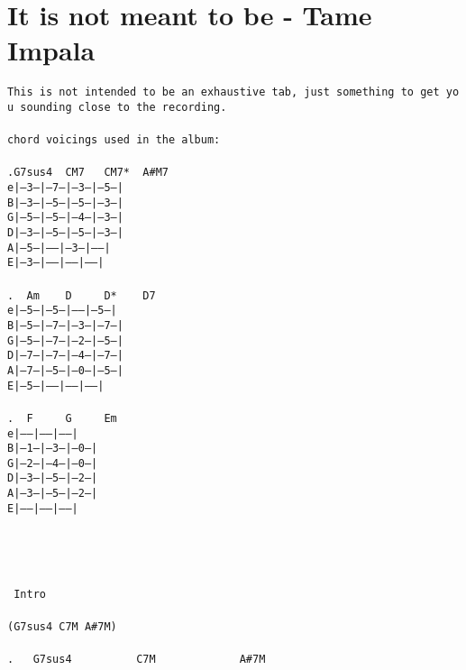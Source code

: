 \newpage
\section{It is not meant to be - Tame Impala}
\label{It is not meant to be - Tame Impala}
\texttt{This\ is\ not\ intended\ to\ be\ an\ exhaustive\ tab,\ just\ something\ to\ get\ you\ sounding\ close\ to\ the\ recording.\\
\\
chord\ voicings\ used\ in\ the\ album:\\
\\
.G7sus4\ \ CM7\ \ \ CM7*\ \ A\#M7\\
e|--3--|--7--|--3--|--5--|\\
B|--3--|--5--|--5--|--3--|\\
G|--5--|--5--|--4--|--3--|\\
D|--3--|--5--|--5--|--3--|\\
A|--5--|-----|--3--|-----|\\
E|--3--|-----|-----|-----|\\
\\
. \ Am\ \ \ \ D\ \ \ \ \ D*\ \ \ \ D7\\
e|--5--|--5--|-----|--5--|\\
B|--5--|--7--|--3--|--7--|\\
G|--5--|--7--|--2--|--5--|\\
D|--7--|--7--|--4--|--7--|\\
A|--7--|--5--|--0--|--5--|\\
E|--5--|-----|-----|-----|\\
\\
. \ F\ \ \ \ \ G\ \ \ \ \ Em\\
e|-----|-----|-----|\\
B|--1--|--3--|--0--|\\
G|--2--|--4--|--0--|\\
D|--3--|--5--|--2--|\\
A|--3--|--5--|--2--|\\
E|-----|-----|-----|\\
\\
\\
\\
\\
\lbrack\ Intro\rbrack\\
\\
(G7sus4\ C7M\ A\#7M)\\
\\
. \ \ G7sus4\ \ \ \ \ \ \ \ \ \ C7M\ \ \ \ \ \ \ \ \ \ \ \ \ A\#7M\\
}
